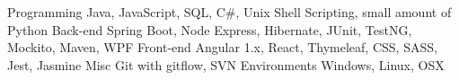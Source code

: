 
\begin{cvskills}
    \cvskill
        {Programming}
        {Java, JavaScript, SQL, C\#, Unix Shell Scripting, small amount of Python}
    \cvskill
        {Back-end}
        {Spring Boot, Node Express, Hibernate, JUnit, TestNG, Mockito, Maven, WPF}
    \cvskill
        {Front-end}
        {Angular 1.x, React, Thymeleaf, CSS, SASS, Jest, Jasmine}
    \cvskill
        {Misc}
        {Git with gitflow, SVN}
    \cvskill
        {Environments}
        {Windows, Linux, OSX}
\end{cvskills}